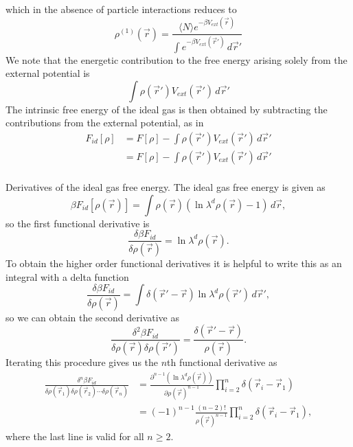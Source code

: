 which in the absence of particle interactions reduces to
\begin{equation*}
  \rho^{(1)}(\vec{r}) =
  \frac{\langle N \rangle e^{-\beta V_{ext}(\vec{r})}}
       {\int e^{-\beta V_{ext}(\vec{r}')} \, d\vec{r}'}
\end{equation*}
We note that the energetic contribution to the free energy arising solely from the external potential is
\begin{equation*}
  \int \rho(\vec{r}') V_{ext}(\vec{r}') \, d\vec{r}'
\end{equation*}
The intrinsic free energy of the ideal gas is then obtained by subtracting the contributions from the external potential, as in
\begin{equation*}
  \begin{aligned}
  F_{id}[\rho] &=
  F[\rho] -
  \int \rho(\vec{r}') V_{ext}(\vec{r}') \, d\vec{r}' \\
  &=
  F[\rho] -
  \int \rho(\vec{r}') V_{ext}(\vec{r}') \, d\vec{r}' \\
  \end{aligned}
\end{equation*}

Derivatives of the ideal gas free energy.
The ideal gas free energy is given as
\begin{equation*}
  \beta F_{id}[\rho(\vec{r})] =
  \int \rho(\vec{r}) (\ln{\lambda^d \rho(\vec{r})} - 1) \, d\vec{r},
\end{equation*}
so the first functional derivative is
\begin{equation*}
  \frac{\delta \beta F_{id}}{\delta \rho(\vec{r})} =
  \ln{\lambda^d \rho(\vec{r})}.
\end{equation*}
To obtain the higher order functional derivatives it is helpful to write this as an integral with a delta function
\begin{equation*}
  \frac{\delta \beta F_{id}}{\delta \rho(\vec{r})} =
  \int \delta{(\vec{r}' - \vec{r})}
  \ln{\lambda^d \rho(\vec{r}')} \, d\vec{r}',
\end{equation*}
so we can obtain the second derivative as
\begin{equation*}
  \frac{\delta^2 \beta F_{id}}{\delta \rho(\vec{r}) \delta \rho(\vec{r}')} =
  \frac{\delta(\vec{r}'-\vec{r})}{\rho(\vec{r})}.
\end{equation*}
Iterating this procedure gives us the $n$th functional derivative as
\begin{equation}
  \begin{aligned}
    \frac{\delta^n \beta F_{id}}{\delta \rho(\vec{r}_1) \delta \rho(\vec{r}_2) \cdots \delta \rho(\vec{r}_n)} &=
    \frac{\partial^{n-1} (\ln{\lambda^d \rho(\vec{r})})}{\partial \rho(\vec{r})^{n-1}}
    \prod_{i=2}^n \delta(\vec{r}_i - \vec{r}_1) \\
    &=
    (-1)^{n-1}
    \frac{(n-2)!}{\rho(\vec{r})^{n-1}}
    \prod_{i=2}^n \delta(\vec{r}_i - \vec{r}_1),
  \end{aligned}
\end{equation}
where the last line is valid for all $n \ge 2$.

